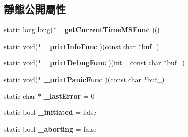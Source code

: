 \subsection*{靜態公開屬性}
\begin{DoxyCompactItemize}
\item 
static long long($\ast$ {\bfseries \+\_\+get\+Current\+Time\+M\+S\+Func} )()\hypertarget{class_magnum_1_1_stage_ac45ad56c561ee35332407b4411ac3c1d}{}\label{class_magnum_1_1_stage_ac45ad56c561ee35332407b4411ac3c1d}

\item 
static void($\ast$ {\bfseries \+\_\+print\+Info\+Func} )(const char $\ast$buf\+\_\+)\hypertarget{class_magnum_1_1_stage_a5b3b86ca28f25534c33cd30dc70cd46b}{}\label{class_magnum_1_1_stage_a5b3b86ca28f25534c33cd30dc70cd46b}

\item 
static void($\ast$ {\bfseries \+\_\+print\+Debug\+Func} )(int i, const char $\ast$buf\+\_\+)\hypertarget{class_magnum_1_1_stage_a6016d841fe1e7aa2a0c28de36e3857c7}{}\label{class_magnum_1_1_stage_a6016d841fe1e7aa2a0c28de36e3857c7}

\item 
static void($\ast$ {\bfseries \+\_\+print\+Panic\+Func} )(const char $\ast$buf\+\_\+)\hypertarget{class_magnum_1_1_stage_a91550b5bbc5c2949b09632831a3b0532}{}\label{class_magnum_1_1_stage_a91550b5bbc5c2949b09632831a3b0532}

\item 
static char $\ast$ {\bfseries \+\_\+last\+Error} = 0\hypertarget{class_magnum_1_1_stage_a6e1a105e19e87e3aaaf113bfb19f886b}{}\label{class_magnum_1_1_stage_a6e1a105e19e87e3aaaf113bfb19f886b}

\item 
static bool {\bfseries \+\_\+initiated} = false\hypertarget{class_magnum_1_1_stage_a6738e44068e8851131159089b5254bd5}{}\label{class_magnum_1_1_stage_a6738e44068e8851131159089b5254bd5}

\item 
static bool {\bfseries \+\_\+aborting} = false\hypertarget{class_magnum_1_1_stage_aa697b7fe915cf45a207ef135ed69f45a}{}\label{class_magnum_1_1_stage_aa697b7fe915cf45a207ef135ed69f45a}

\end{DoxyCompactItemize}


